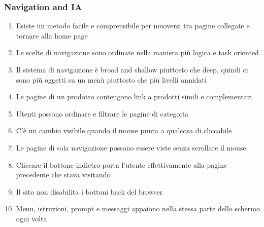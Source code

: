 \documentclass[../Report.tex]{subfiles}
\begin{document}
    \subsubsection{Navigation and IA}
    \begin{enumerate}
        \item Esiste un metodo facile e comprensibile per muoversi tra pagine collegate e tornare alla home page 
        \item Le scelte di navigazione sono ordinate nella maniera più logica e task oriented
        \item Il sistema di navigazione è broad and shallow piuttosto che deep, quindi ci sono più oggetti su un menù piuttosto che piu livelli annidati 
        \item Le pagine di un prodotto contengono link a prodotti simili e complementari 
        \item Utenti possono ordinare e filtrare le pagine di categoria
        \item C’è un cambio visibile quando il mouse punta a qualcosa di cliccabile
        \item Le pagine di sola navigazione possono essere viste senza scrollare il mouse 
        \item Cliccare il bottone indietro porta l’utente effettivamente alla pagine precedente che stava visitando
        \item Il sito non disabilita i bottoni back del browser
        \item Menu, istruzioni, prompt e messaggi appaiono nella stessa parte dello schermo ogni volta 
    \end{enumerate}
\end{document}
